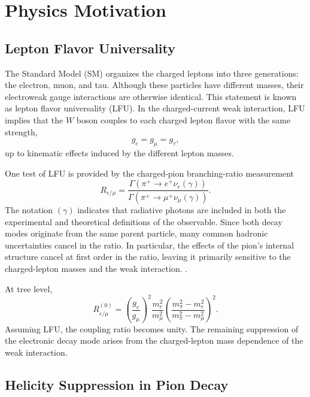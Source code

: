 \section{Physics Motivation}

\subsection{Lepton Flavor Universality}

The Standard Model (SM) organizes the charged leptons into three generations:
the electron, muon, and tau. Although these particles have different masses,
their electroweak gauge interactions are otherwise identical. This statement is
known as lepton flavor universality (LFU). In the charged-current weak
interaction, LFU implies that the $W$ boson couples to each charged lepton
flavor with the same strength,
\begin{equation}
  g_e = g_\mu = g_\tau,
  \label{eq:lfu-couplings}
\end{equation}
up to kinematic effects induced by the different lepton masses.

One test of LFU is provided by the charged-pion branching-ratio
measurement
\begin{equation}
  R_{e/\mu}
  =
  \frac{
    \Gamma\!\left(\pi^{+}\to e^{+}\nu_e(\gamma)\right)
  }{
    \Gamma\!\left(\pi^{+}\to \mu^{+}\nu_\mu(\gamma)\right)
  }.
  \label{eq:remu-definition}
\end{equation}
The notation $(\gamma)$ indicates that radiative photons are included in both
the experimental and theoretical definitions of the observable. Since both decay
modes originate from the same parent particle, many common hadronic
uncertainties cancel in the ratio. In particular, the effects of 
the pion’s internal structure cancel at first order in the ratio, leaving it primarily 
sensitive to the charged-lepton masses and the weak interaction.
\cite{pioneer_rare_2022,pioneer_proposal_2022}.

At tree level,
\begin{equation}
  R_{e/\mu}^{(0)}
  =
  \left(\frac{g_e}{g_\mu}\right)^2
  \frac{m_e^2}{m_\mu^2}
  \left(
    \frac{
      m_\pi^2-m_e^2
    }{
      m_\pi^2-m_\mu^2
    }
  \right)^2.
  \label{eq:remu-tree}
\end{equation}
Assuming LFU, the coupling ratio becomes unity. The remaining suppression of
the electronic decay mode arises from the charged-lepton mass dependence of the
weak interaction.

\subsection{Helicity Suppression in Pion Decay}

